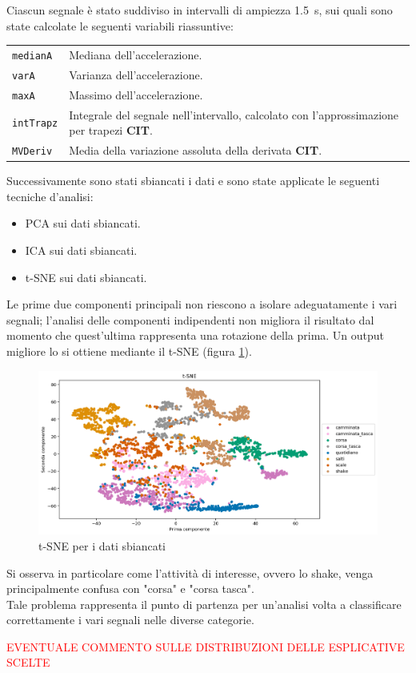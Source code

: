 \documentclass[./main.tex]{subfiles}
\begin{document}
Ciascun segnale è stato suddiviso in intervalli di ampiezza \SI{1.5}{s}, sui quali sono state calcolate le seguenti variabili riassuntive:
\begin{table}[H]
	\begin{tabular}{ll}
		\texttt{medianA}& Mediana dell'accelerazione.\\
		\texttt{varA}& Varianza dell'accelerazione.\\
		\texttt{maxA}& Massimo dell'accelerazione.\\
		\texttt{intTrapz}& Integrale del segnale nell'intervallo, calcolato con l'approssimazione per trapezi \textbf{CIT}.\\
		\texttt{MVDeriv}& Media della variazione assoluta della derivata \textbf{CIT}.
	\end{tabular}
\end{table}
Successivamente sono stati sbiancati i dati e sono state applicate le seguenti tecniche d'analisi:
\begin{itemize}
	\item PCA sui dati sbiancati.
	\item ICA sui dati sbiancati.
	\item t-SNE sui dati sbiancati.
\end{itemize}
Le prime due componenti principali non riescono a isolare adeguatamente i vari segnali; l'analisi delle componenti indipendenti non migliora il risultato dal momento che quest'ultima rappresenta una rotazione della prima. Un output migliore lo si ottiene mediante il t-SNE (figura \ref{t-sne}). 
\begin{figure}[H]
	\centering
	\includegraphics[width=.8\textwidth, keepaspectratio]{../../figure/t-SNE.png}
	\caption{{ t-SNE per i dati sbiancati}}
	\label{t-sne}
\end{figure}
Si osserva in particolare come l'attività di interesse, ovvero lo shake, venga principalmente confusa con "corsa" e "corsa tasca". 
\\
Tale problema rappresenta il punto di partenza per un'analisi volta a classificare correttamente i vari segnali nelle diverse categorie.

\textcolor{red}{EVENTUALE COMMENTO SULLE DISTRIBUZIONI DELLE ESPLICATIVE SCELTE}
\end{document}
